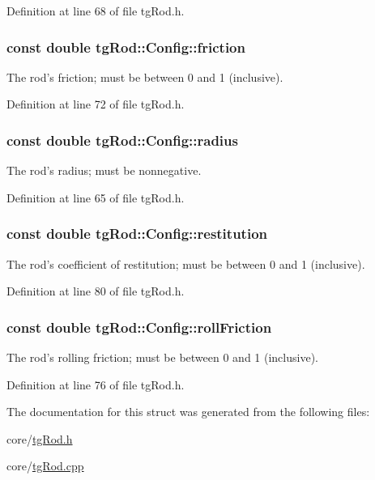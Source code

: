 Definition at line 68 of file tg\-Rod.\-h.

\hypertarget{structtg_rod_1_1_config_a7c85c2b9b8f2d30fea1a8c5e498b2fd6}{
\subsubsection[{friction}]{\setlength{\rightskip}{0pt plus 5cm}const double tg\-Rod\-::\-Config\-::friction}}\label{structtg_rod_1_1_config_a7c85c2b9b8f2d30fea1a8c5e498b2fd6}
The rod's friction; must be between 0 and 1 (inclusive). 

Definition at line 72 of file tg\-Rod.\-h.

\hypertarget{structtg_rod_1_1_config_a20c2370d27608ee1d7e8521095f6b0df}{
\subsubsection[{radius}]{\setlength{\rightskip}{0pt plus 5cm}const double tg\-Rod\-::\-Config\-::radius}}\label{structtg_rod_1_1_config_a20c2370d27608ee1d7e8521095f6b0df}
The rod's radius; must be nonnegative. 

Definition at line 65 of file tg\-Rod.\-h.

\hypertarget{structtg_rod_1_1_config_aa16247d472088ec2476f409da5f92f87}{
\subsubsection[{restitution}]{\setlength{\rightskip}{0pt plus 5cm}const double tg\-Rod\-::\-Config\-::restitution}}\label{structtg_rod_1_1_config_aa16247d472088ec2476f409da5f92f87}
The rod's coefficient of restitution; must be between 0 and 1 (inclusive). 

Definition at line 80 of file tg\-Rod.\-h.

\hypertarget{structtg_rod_1_1_config_a99421c0930dce83ed7721fe899611e7c}{
\subsubsection[{roll\-Friction}]{\setlength{\rightskip}{0pt plus 5cm}const double tg\-Rod\-::\-Config\-::roll\-Friction}}\label{structtg_rod_1_1_config_a99421c0930dce83ed7721fe899611e7c}
The rod's rolling friction; must be between 0 and 1 (inclusive). 

Definition at line 76 of file tg\-Rod.\-h.



The documentation for this struct was generated from the following files\-:\begin{DoxyCompactItemize}
\item 
core/\hyperlink{tg_rod_8h}{tg\-Rod.\-h}\item 
core/\hyperlink{tg_rod_8cpp}{tg\-Rod.\-cpp}\end{DoxyCompactItemize}
